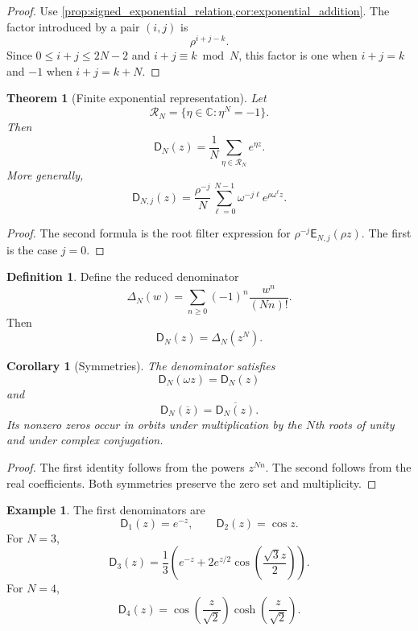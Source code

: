\documentclass{aomart}
\newtheorem{theorem}{Theorem}[section]
\newtheorem{corollary}[corollary]{Corollary}
\theoremstyle{definition}
\newtheorem{definition}[definition]{Definition}
\newtheorem{example}[example]{Example}
\theoremstyle{remark}
\newcommand{\CC}{\mathbb C}
\newcommand{\Rcal}{\mathcal R}
\newcommand{\Dfun}{\mathsf D}
\newcommand{\Efun}{\mathsf E}
\begin{document}
\begin{proof}
Use \cref{prop:signed_exponential_relation,cor:exponential_addition}.  The factor introduced by a pair $(i,j)$ is
\[
\rho^{i+j-k}.
\]
Since $0\leq i+j\leq2N-2$ and $i+j\equiv k\bmod N$, this factor is one when $i+j=k$ and $-1$ when $i+j=k+N$.
\end{proof}

\begin{theorem}[Finite exponential representation]\label{thm:finite_exponential_representation}
Let
\[
\Rcal_N=\{\eta\in\CC\mathrel{:}\eta^N=-1\}.
\]
Then
\[
\Dfun_N(z)
=
\frac1N\sum_{\eta\in\Rcal_N}e^{\eta z}.
\]
More generally,
\[
\Dfun_{N,j}(z)
=
\frac{\rho^{-j}}N
\sum_{\ell=0}^{N-1}
\omega^{-j\ell}e^{\rho\omega^\ell z}.
\]
\end{theorem}

\begin{proof}
The second formula is the root filter expression for $\rho^{-j}\Efun_{N,j}(\rho z)$.  The first is the case $j=0$.
\end{proof}

\begin{definition}\label{def:reduced_denominator}
Define the reduced denominator
\[
\Delta_N(w)
=
\sum_{n\geq0}(-1)^n\frac{w^n}{(Nn)!}.
\]
Then
\[
\Dfun_N(z)=\Delta_N(z^N).
\]
\end{definition}

\begin{corollary}[Symmetries]\label{cor:denominator_symmetries}
The denominator satisfies
\[
\Dfun_N(\omega z)=\Dfun_N(z)
\]
and
\[
\Dfun_N(\overline z)=\overline{\Dfun_N(z)}.
\]
Its nonzero zeros occur in orbits under multiplication by the $N$th roots of unity and under complex conjugation.
\end{corollary}

\begin{proof}
The first identity follows from the powers $z^{Nn}$.  The second follows from the real coefficients.  Both symmetries preserve the zero set and multiplicity.
\end{proof}

\begin{example}\label{ex:small_denominators}
The first denominators are
\[
\Dfun_1(z)=e^{-z},
\qquad
\Dfun_2(z)=\cos z.
\]
For $N=3$,
\[
\Dfun_3(z)
=
\frac13\left(
e^{-z}
+2e^{z/2}\cos\left(\frac{\sqrt3z}{2}\right)
\right).
\]
For $N=4$,
\[
\Dfun_4(z)
=
\cos\left(\frac z{\sqrt2}\right)
\cosh\left(\frac z{\sqrt2}\right).
\]
\end{example}
\end{document}
